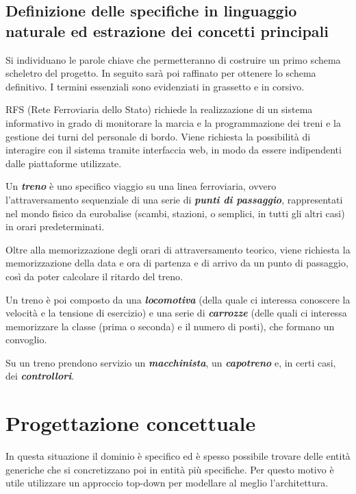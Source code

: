 \documentclass[a4paper,12pt]{report}
\begin{document}
	\section{Definizione delle specifiche in linguaggio naturale ed estrazione dei concetti principali}
	\par Si individuano le parole chiave che permetteranno di costruire un primo schema scheletro del progetto. In seguito sarà poi raffinato per ottenere lo schema definitivo. I termini essenziali sono evidenziati in grassetto e in corsivo.
	\par RFS (Rete Ferroviaria dello Stato) richiede la realizzazione di un sistema informativo in grado di monitorare la marcia e la programmazione dei treni e la gestione dei turni del personale di bordo. Viene richiesta la possibilità di interagire con il sistema tramite interfaccia web, in modo da essere indipendenti dalle piattaforme utilizzate.
	\par Un \textbf{\textit{treno}} è uno specifico viaggio su una linea ferroviaria, ovvero l'attraversamento sequenziale di una serie di \textbf{\textit{punti di passaggio}}, rappresentati nel mondo fisico da eurobalise (scambi, stazioni, o semplici, in tutti gli altri casi) in orari predeterminati.
	\par Oltre alla memorizzazione degli orari di attraversamento teorico, viene richiesta la memorizzazione della data e ora di partenza e di arrivo da un punto di passaggio, così da poter calcolare il ritardo del treno.
	\par Un treno è poi composto da una \textbf{\textit{locomotiva}} (della quale ci interessa conoscere la velocità e la tensione di esercizio) e una serie di \textbf{\textit{carrozze}} (delle quali ci interessa memorizzare la classe (prima o seconda) e il numero di posti), che formano un convoglio.
	\par Su un treno prendono servizio un \textbf{\textit{macchinista}}, un \textbf{\textit{capotreno}} e, in certi casi, dei \textbf{\textit{controllori}}.
	\chapter{Progettazione concettuale}
	\par In questa situazione il dominio è specifico ed è spesso possibile trovare delle entità generiche che si concretizzano poi in entità più specifiche. Per questo motivo è utile utilizzare un approccio top-down per modellare al meglio l'architettura.
\end{document}
